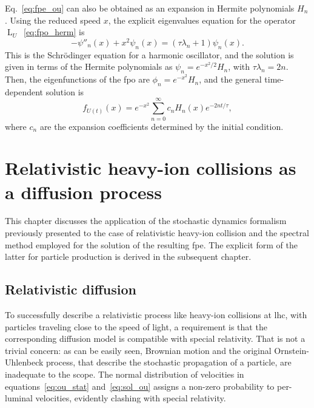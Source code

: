 \documentclass[a4paper,12pt]{book}
\begin{document}
Eq.~\eqref{eq:fpe_ou} can also be obtained as an expansion in Hermite polynomials $H_n$. Using the reduced speed $x$, the explicit eigenvalues equation for the operator $\operatorname{L}_{U}$~\eqref{eq:fpo_herm} is
\begin{equation}
    -\psi''_n(x) + x^2 \psi_n(x) = (\tau\lambda_n + 1)\psi_n(x).
\end{equation}
This is the Schrödinger equation for a harmonic oscillator, and the solution is given in terms of the Hermite polynomials as $\psi_n = e^{-x^2/2}H_n$, with $\tau\lambda_n = 2n$. Then, the eigenfunctions of the \acrshort{fpo} are $\phi_n =  e^{-x^2}H_n$, and the general time-dependent solution is
\begin{equation}
     f_{U(t)}(x) = e^{-x^2}\sum_{n=0}^\infty c_n  H_n(x) e^{-2nt/\tau},
\end{equation}
where $c_n$ are the expansion coefficients determined by the initial condition. 




\chapter{Relativistic heavy-ion collisions as a diffusion process}\label{chap:heavy-ions}
This chapter discusses the application of the stochastic dynamics formalism previously presented to the case of relativistic heavy-ion collision and the spectral method employed for the solution of the resulting \acrshort{fpe}. The explicit form of the latter for particle production is derived in the subsequent chapter. 


\section{Relativistic diffusion}

To successfully describe a relativistic process like heavy-ion collisions at \acrshort{lhc}, with particles traveling close to the speed of light, a requirement is that the corresponding diffusion model is compatible with special relativity. That is not a trivial concern: as can be easily seen, Brownian motion and the original Ornstein-Uhlenbeck process, that describe the stochastic propagation of a particle, are inadequate to the scope. The normal distribution of velocities in equations~\eqref{eq:ou_stat} and~\eqref{eq:sol_ou} assigns a non-zero probability to per-luminal velocities, evidently clashing with special relativity. 
\end{document}
